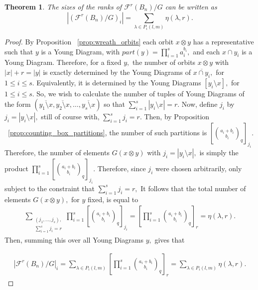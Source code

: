 \documentclass{amsart}
\newtheorem{thm}{Theorem}[subsection]
\theoremstyle{remark}
\begin{document}
\begin{thm}
\label{thm:quotiented_edge_wreath}
The sizes of the ranks of $\mathcal F^r(B_n)/G$ can be written as 
$$|(\mathcal F^r(B_n)/G)_i| = \sum_{\lambda \in P_i(l,m)} \eta(\lambda,r).$$
\end{thm}
\begin{proof}

By Proposition ~\ref{prop:wreath_orbits} each orbit $x \otimes y$ has a representative such that $y$ is a Young Diagram, with $part(y) = \prod_{i=1}^s a_i^{b_i},$ and each $x \cap y_i$ is a Young Diagram. Therefore, for a fixed $y,$ the number of orbits $x \otimes y$ with $|x|+r = |y|$ is exactly determined by the Young Diagrams of $\overline{x \cap y_i},$ for $1 \leq i \leq s.$ Equivalently, it is determined by the Young Diagrams $[y_i \setminus x],$ for $1 \leq i \leq s.$ So, we wish to calculate the number of tuples of Young Diagrams of the form $(\overline{y_1 \setminus x},\overline{y_2 \setminus x},\ldots, \overline{y_s \setminus x})$ so that $\sum_{i=1}^s |y_i \setminus x| = r.$ Now, define $j_i$ by $j_i = |y_i \setminus x|,$ still of course with, $\sum_{i=1}^s j_i = r.$ Then, by Proposition ~\ref{prop:counting_box_partitions}, the number of such partitions is $[\binom {a_i+b_i} {b_i}_q]_{j_i}.$ Therefore, the number of elements $G(x\otimes y)$ with $j_i = |y_i \setminus x|,$ is simply the product $\prod_{i=1}^s [\binom {a_i+b_i} {b_i}_q]_{j_i}.$ Therefore, since $j_i$ were chosen arbitrarily, only subject to the constraint that $\sum_{i=1}^s j_i = r,$ It follows that the total number of elements $G(x\otimes y),$ for $y$ fixed, is equal to 
\begin{align*}
\sum_{\substack{{(j_1,\ldots, j_s),}\\{\sum_{i=1}^s j_i = r}}} \prod_{i=1}^s \left[\binom {a_i+b_i} {b_i}_q\right]_{j_i} = \left[\prod_{i=1}^s \binom {a_i+b_i} {b_i}_q\right]_{r} = \eta(\lambda,r).
\end{align*}
Then, summing this over all Young Diagrams $y,$ gives that

\begin{align*}
|\mathcal F^r(B_n)/G|_i = \sum_{\lambda \in P_i(l,m)}  \left[\prod_{i=1}^s \binom {a_i+b_i} {b_i}_q\right]_{r} = \sum_{\lambda \in P_i(l,m)} \eta(\lambda,r).
\end{align*}

\end{proof}



\end{document}
